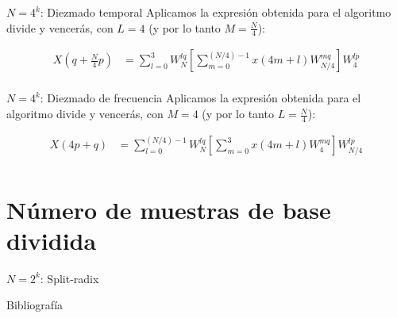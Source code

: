 \documentclass{beamer}
\begin{document}
\begin{frame}{$N = 4^k$: Diezmado temporal}
Aplicamos la expresión obtenida para el algoritmo divide y vencerás,
con $L = 4$ (y por lo tanto $M = \frac{N}{4}$):

\begin{align*}
X(q + \frac{N}{4}p) &= \sum_{l = 0}^3 W_N^{lq} \left[\sum_{m = 0}^{(N/4) - 1} x(4m + l) W_{N/4}^{mq}\right] W_4^{lp} \\
\end{align*}
\end{frame}

\begin{frame}{$N = 4^k$: Diezmado de frecuencia}
Aplicamos la expresión obtenida para el algoritmo divide y vencerás,
con $M = 4$ (y por lo tanto $L = \frac{N}{4}$):

\begin{align*}
X(4p + q) &= \sum_{l = 0}^{(N/4) - 1} W_{N}^{lq} \left[\sum_{m = 0}^3 x(4m + l) W_{4}^{mq}\right] W_{N/4}^{lp} \\
\end{align*}
\end{frame}

\section{Número de muestras de base dividida}

\begin{frame}{$N = 2^k$: Split-radix}
\end{frame}

\begin{frame}{Bibliografía}
\printbibliography
\end{frame}
\end{document}
